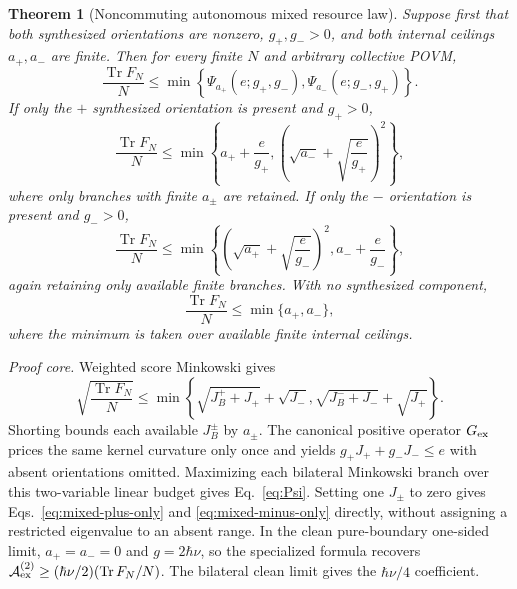 \documentclass[aps,pra,preprint,nofootinbib]{revtex4-2}
\newtheorem{theorem}{Theorem}
\newcommand{\Tr}{\operatorname{Tr}}
\newcommand{\Fcl}{F}
\newcommand{\Aact}{\mathcal A}
\begin{document}
\begin{theorem}[Noncommuting autonomous mixed resource law]
\label{thm:mixed}
Suppose first that both synthesized orientations are nonzero, $g_+,g_->0$, and both internal ceilings $a_+,a_-$ are finite. Then for every finite $N$ and arbitrary collective POVM,
\begin{equation}
\boxed{
\frac{\Tr \Fcl_N}{N}
\le
\min\!\left\{
\Psi_{a_+}(e;g_+,g_-),
\Psi_{a_-}(e;g_-,g_+)
\right\}.
}
\label{eq:mixed-master}
\end{equation}
If only the $+$ synthesized orientation is present and $g_+>0$,
\begin{equation}
\boxed{
\frac{\Tr \Fcl_N}{N}
\le
\min\!\left\{
a_+ +\frac{e}{g_+},
\left(\sqrt{a_-}+\sqrt{\frac{e}{g_+}}\right)^2
\right\},
}
\label{eq:mixed-plus-only}
\end{equation}
where only branches with finite $a_\pm$ are retained. If only the $-$ orientation is present and $g_->0$,
\begin{equation}
\boxed{
\frac{\Tr \Fcl_N}{N}
\le
\min\!\left\{
\left(\sqrt{a_+}+\sqrt{\frac{e}{g_-}}\right)^2,
a_- +\frac{e}{g_-}
\right\},
}
\label{eq:mixed-minus-only}
\end{equation}
again retaining only available finite branches. With no synthesized component,
\begin{equation}
\boxed{
\frac{\Tr \Fcl_N}{N}\le\min\{a_+,a_-\},
}
\label{eq:mixed-support-only}
\end{equation}
where the minimum is taken over available finite internal ceilings.
\end{theorem}

\emph{Proof core.} Weighted score Minkowski gives
\begin{equation}
\sqrt{\frac{\Tr F_N}{N}}
\le\min\!\left\{
\sqrt{J_B^++J_+}+\sqrt{J_-},
\sqrt{J_B^-+J_-}+\sqrt{J_+}
\right\}.
\end{equation}
Shorting bounds each available $J_B^\pm$ by $a_\pm$. The canonical positive operator $G_{\rm ex}$ prices the same kernel curvature only once and yields $g_+J_++g_-J_-\le e$ with absent orientations omitted. Maximizing each bilateral Minkowski branch over this two-variable linear budget gives Eq.~\eqref{eq:Psi}. Setting one $J_\pm$ to zero gives Eqs.~\eqref{eq:mixed-plus-only} and \eqref{eq:mixed-minus-only} directly, without assigning a restricted eigenvalue to an absent range. In the clean pure-boundary one-sided limit, $a_+=a_-=0$ and $g=2\hbar\nu$, so the specialized formula recovers $\Aact_{\rm ex}^{(2)}\ge(\hbar\nu/2)(\Tr F_N/N)$. The bilateral clean limit gives the $\hbar\nu/4$ coefficient.
\end{document}
